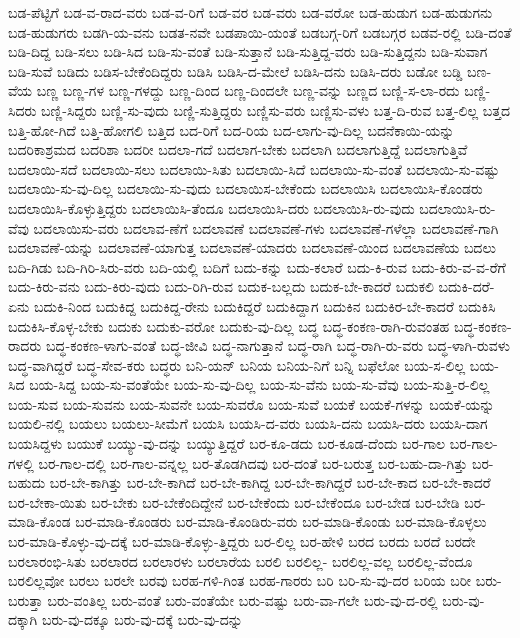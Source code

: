 {ಬಡ-ಪೆಟ್ಟಿಗೆ
ಬಡ-ವ-ರಾದ-ವರು
ಬಡ-ವ-ರಿಗೆ
ಬಡ-ವರ
ಬಡ-ವರು
ಬಡ-ವರೋ
ಬಡ-ಹುಡುಗ
ಬಡ-ಹುಡುಗನು
ಬಡ-ಹುಡುಗರು
ಬಡಗಿ-ಯ-ವನು
ಬಡತ-ನವೇ
ಬಡಪಾಯಿ-ಯಂತೆ
ಬಡಬಗ್ಗ-ರಿಗೆ
ಬಡಬಗ್ಗರ
ಬಡವ-ರಲ್ಲಿ
ಬಡಿ-ದಂತೆ
ಬಡಿ-ದಿದ್ದ
ಬಡಿ-ಸಲು
ಬಡಿ-ಸಿದ
ಬಡಿ-ಸು-ವಂತೆ
ಬಡಿ-ಸುತ್ತಾನೆ
ಬಡಿ-ಸುತ್ತಿದ್ದ-ವರು
ಬಡಿ-ಸುತ್ತಿದ್ದನು
ಬಡಿ-ಸುವಾಗ
ಬಡಿ-ಸುವೆ
ಬಡಿದು
ಬಡಿಸ-ಬೇಕೆಂದಿದ್ದರು
ಬಡಿಸಿ
ಬಡಿಸಿ-ದ-ಮೇಲೆ
ಬಡಿಸಿ-ದನು
ಬಡಿಸಿ-ದರು
ಬಡೋ
ಬಡ್ಡಿ
ಬಣ-ವೆಯ
ಬಣ್ಣ
ಬಣ್ಣ-ಗಳ
ಬಣ್ಣ-ಗಳದ್ದು
ಬಣ್ಣ-ದಿಂದ
ಬಣ್ಣ-ದಿಂದಲೇ
ಬಣ್ಣ-ವನ್ನು
ಬಣ್ಣದ
ಬಣ್ಣಿ-ಸ-ಲಾ-ರದು
ಬಣ್ಣಿ-ಸಿದರು
ಬಣ್ಣಿ-ಸಿದ್ದರು
ಬಣ್ಣಿ-ಸು-ವುದು
ಬಣ್ಣಿ-ಸುತ್ತಿದ್ದರು
ಬಣ್ಣಿಸು-ವರು
ಬಣ್ಣಿಸು-ವಳು
ಬತ್ತ-ದಿ-ರುವ
ಬತ್ತ-ಲಿಲ್ಲ
ಬತ್ತದ
ಬತ್ತಿ-ಹೋ-ಗಿದೆ
ಬತ್ತಿ-ಹೋಗಲಿ
ಬತ್ತಿದ
ಬದ-ರಿಗೆ
ಬದ-ರಿಯ
ಬದ-ಲಾಗು-ವು-ದಿಲ್ಲ
ಬದನೆಕಾಯಿ-ಯನ್ನು
ಬದರಿಕಾಶ್ರಮದ
ಬದರಿಶಾ
ಬದರೀ
ಬದಲಾ-ಗದೆ
ಬದಲಾಗ-ಬೇಕು
ಬದಲಾಗಿ
ಬದಲಾಗುತ್ತಿದ್ದೆ
ಬದಲಾಗುತ್ತಿವೆ
ಬದಲಾಯಿ-ಸದೆ
ಬದಲಾಯಿ-ಸಲು
ಬದಲಾಯಿ-ಸಿತು
ಬದಲಾಯಿ-ಸಿದೆ
ಬದಲಾಯಿ-ಸು-ವಂತೆ
ಬದಲಾಯಿ-ಸು-ವಷ್ಟು
ಬದಲಾಯಿ-ಸು-ವು-ದಿಲ್ಲ
ಬದಲಾಯಿ-ಸು-ವುದು
ಬದಲಾಯಿಸ-ಬೇಕೆಂದು
ಬದಲಾಯಿಸಿ
ಬದಲಾಯಿಸಿ-ಕೊಂಡರು
ಬದಲಾಯಿಸಿ-ಕೊಳ್ಳುತ್ತಿದ್ದರು
ಬದಲಾಯಿಸಿ-ತೆಂದೂ
ಬದಲಾಯಿಸಿ-ದರು
ಬದಲಾಯಿಸಿ-ರು-ವುದು
ಬದಲಾಯಿಸಿ-ರು-ವೆವು
ಬದಲಾಯಿಸು-ವರು
ಬದಲಾವ-ಣೆಗೆ
ಬದಲಾವಣೆ
ಬದಲಾವಣೆ-ಗಳು
ಬದಲಾವಣೆ-ಗಳೆಲ್ಲಾ
ಬದಲಾವಣೆ-ಗಾಗಿ
ಬದಲಾವಣೆ-ಯನ್ನು
ಬದಲಾವಣೆ-ಯಾಗುತ್ತ
ಬದಲಾವಣೆ-ಯಾದರು
ಬದಲಾವಣೆ-ಯಿಂದ
ಬದಲಾವಣೆಯ
ಬದಲು
ಬದಿ-ಗಿಡು
ಬದಿ-ಗಿರಿ-ಸಿರು-ವರು
ಬದಿ-ಯಲ್ಲಿ
ಬದಿಗೆ
ಬದು-ಕನ್ನು
ಬದು-ಕಲಾರೆ
ಬದು-ಕಿ-ರುವ
ಬದು-ಕಿರು-ವ-ವ-ರೆಗೆ
ಬದು-ಕಿರು-ವನು
ಬದು-ಕಿರು-ವುದು
ಬದು-ರಿಗಿ-ರುವ
ಬದುಕ-ಬಲ್ಲದು
ಬದುಕ-ಬೇ-ಕಾದರೆ
ಬದುಕಲಿ
ಬದುಕಿ-ದರೆ-ಏನು
ಬದುಕಿ-ನಿಂದ
ಬದುಕಿದ್ದ
ಬದುಕಿದ್ದ-ರೇನು
ಬದುಕಿದ್ದರೆ
ಬದುಕಿದ್ದಾಗ
ಬದುಕಿನ
ಬದುಕಿರ-ಬೇ-ಕಾದರೆ
ಬದುಕಿಸಿ
ಬದುಕಿಸಿ-ಕೊಳ್ಳ-ಬೇಕು
ಬದುಕು
ಬದುಕು-ವರೋ
ಬದುಕು-ವು-ದಿಲ್ಲ
ಬದ್ಧ
ಬದ್ಧ-ಕಂಕಣ-ರಾಗಿ-ರುವಂತಹ
ಬದ್ಧ-ಕಂಕಣ-ರಾದರು
ಬದ್ಧ-ಕಂಕಣ-ಳಾಗು-ವಂತೆ
ಬದ್ಧ-ಜೀವಿ
ಬದ್ಧ-ನಾಗುತ್ತಾನೆ
ಬದ್ಧ-ರಾಗಿ
ಬದ್ಧ-ರಾಗಿ-ರು-ವರು
ಬದ್ಧ-ಳಾಗಿ-ರುವಳು
ಬದ್ಧ-ವಾಗಿದ್ದರೆ
ಬದ್ಧ-ಸೇವ-ಕರು
ಬದ್ಧರು
ಬನಿ-ಯನ್
ಬನಿಯ
ಬನಿಯ-ನಿಗೆ
ಬನ್ನಿ
ಬಫೆಲೋ
ಬಯ-ಸ-ಲಿಲ್ಲ
ಬಯ-ಸಿದ
ಬಯ-ಸಿದ್ದ
ಬಯ-ಸು-ವಂತೆಯೇ
ಬಯ-ಸು-ವು-ದಿಲ್ಲ
ಬಯ-ಸು-ವೆನು
ಬಯ-ಸು-ವೆವು
ಬಯ-ಸುತ್ತಿ-ರ-ಲಿಲ್ಲ
ಬಯ-ಸುವ
ಬಯ-ಸುವನು
ಬಯ-ಸುವನೇ
ಬಯ-ಸುವರೊ
ಬಯ-ಸುವೆ
ಬಯಕೆ
ಬಯಕೆ-ಗಳನ್ನು
ಬಯಕೆ-ಯನ್ನು
ಬಯಲಿ-ನಲ್ಲಿ
ಬಯಲು
ಬಯಲು-ಸೀಮೆಗೆ
ಬಯಸಿ
ಬಯಸಿ-ದ-ವರು
ಬಯಸಿ-ದನು
ಬಯಸಿ-ದರು
ಬಯಸಿ-ದಾಗ
ಬಯಸಿದ್ದಳು
ಬಯುಕೆ
ಬಯ್ಯು-ವು-ದನ್ನು
ಬಯ್ಯುತ್ತಿದ್ದರೆ
ಬರ-ಕೂ-ಡದು
ಬರ-ಕೂಡ-ದೆಂದು
ಬರ-ಗಾಲ
ಬರ-ಗಾಲ-ಗಳಲ್ಲಿ
ಬರ-ಗಾಲ-ದಲ್ಲಿ
ಬರ-ಗಾಲ-ವನ್ನಲ್ಲ
ಬರ-ತೊಡಗಿದವು
ಬರ-ದಂತೆ
ಬರ-ಬರುತ್ತ
ಬರ-ಬಹು-ದಾ-ಗಿತ್ತು
ಬರ-ಬಹುದು
ಬರ-ಬೇ-ಕಾಗಿತ್ತು
ಬರ-ಬೇ-ಕಾಗಿದೆ
ಬರ-ಬೇ-ಕಾಗಿದ್ದ
ಬರ-ಬೇ-ಕಾಗಿದ್ದರೆ
ಬರ-ಬೇ-ಕಾದ
ಬರ-ಬೇ-ಕಾದರೆ
ಬರ-ಬೇಕಾ-ಯಿತು
ಬರ-ಬೇಕು
ಬರ-ಬೇಕೆಂದಿದ್ದೇನೆ
ಬರ-ಬೇಕೆಂದು
ಬರ-ಬೇಕೆಂದೂ
ಬರ-ಬೇಡ
ಬರ-ಬೇಡಿ
ಬರ-ಮಾಡಿ-ಕೊಂಡ
ಬರ-ಮಾಡಿ-ಕೊಂಡರು
ಬರ-ಮಾಡಿ-ಕೊಂಡಿರು-ವರು
ಬರ-ಮಾಡಿ-ಕೊಂಡು
ಬರ-ಮಾಡಿ-ಕೊಳ್ಳಲು
ಬರ-ಮಾಡಿ-ಕೊಳ್ಳು-ವು-ದಕ್ಕೆ
ಬರ-ಮಾಡಿ-ಕೊಳ್ಳು-ತ್ತಿದ್ದರು
ಬರ-ಲಿಲ್ಲ
ಬರ-ಹೇಳಿ
ಬರದ
ಬರದು
ಬರದೆ
ಬರದೇ
ಬರಲಾರಂಭಿ-ಸಿತು
ಬರಲಾರದ
ಬರಲಾರಳು
ಬರಲಾರೆಯ
ಬರಲಿ
ಬರಲಿಲ್ಲ-
ಬರಲಿಲ್ಲ-ವಲ್ಲ
ಬರಲಿಲ್ಲ-ವೆಂದೂ
ಬರಲಿಲ್ಲವೋ
ಬರಲು
ಬರಲೇ
ಬರವು
ಬರಹ-ಗಳಿ-ಗಿಂತ
ಬರಹ-ಗಾರರು
ಬರಿ
ಬರಿ-ಸು-ವು-ದರ
ಬರಿಯ
ಬರೀ
ಬರು-ಬರುತ್ತಾ
ಬರು-ವಂತಿಲ್ಲ
ಬರು-ವಂತೆ
ಬರು-ವಂತೆಯೇ
ಬರು-ವಷ್ಟು
ಬರು-ವಾ-ಗಲೇ
ಬರು-ವು-ದ-ರಲ್ಲಿ
ಬರು-ವು-ದಕ್ಕಾಗಿ
ಬರು-ವು-ದಕ್ಕೂ
ಬರು-ವು-ದಕ್ಕೆ
ಬರು-ವು-ದನ್ನು
}
